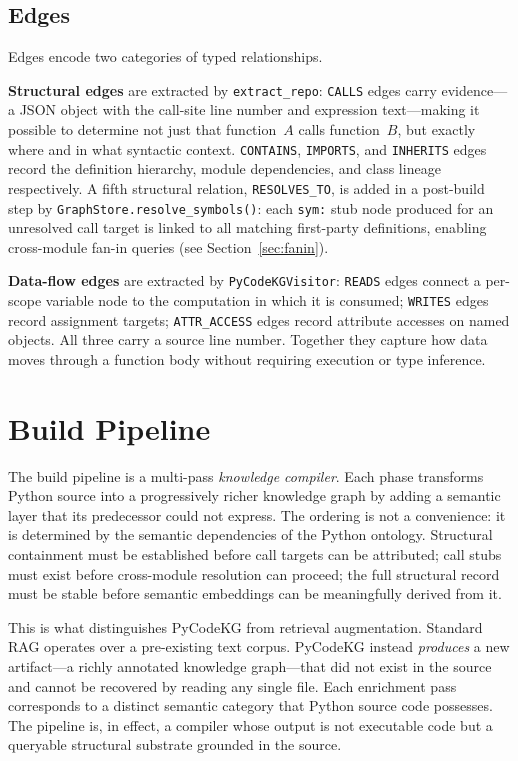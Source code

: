 \documentclass[10pt]{article}
\begin{document}
\subsection{Edges}

Edges encode two categories of typed relationships.

\textbf{Structural edges} are extracted by \texttt{extract\_repo}: \texttt{CALLS}
edges carry evidence---a JSON object with the call-site line number and expression
text---making it possible to determine not just that function~$A$ calls
function~$B$, but exactly where and in what syntactic context. \texttt{CONTAINS},
\texttt{IMPORTS}, and \texttt{INHERITS} edges record the definition hierarchy,
module dependencies, and class lineage respectively. A fifth structural relation,
\texttt{RESOLVES\_TO}, is added in a post-build step by
\texttt{GraphStore.resolve\_symbols()}: each \texttt{sym:} stub node produced
for an unresolved call target is linked to all matching first-party definitions,
enabling cross-module fan-in queries (see Section~\ref{sec:fanin}).

\textbf{Data-flow edges} are extracted by \texttt{PyCodeKGVisitor}: \texttt{READS}
edges connect a per-scope variable node to the computation in which it is consumed;
\texttt{WRITES} edges record assignment targets; \texttt{ATTR\_ACCESS} edges record
attribute accesses on named objects. All three carry a source line number. Together
they capture how data moves through a function body without requiring execution or
type inference.

\section{Build Pipeline}
\label{sec:pipeline}

The build pipeline is a multi-pass \emph{knowledge compiler}. Each phase
transforms Python source into a progressively richer knowledge graph by adding
a semantic layer that its predecessor could not express. The ordering is not
a convenience: it is determined by the semantic dependencies of the Python
ontology. Structural containment must be established before call targets can
be attributed; call stubs must exist before cross-module resolution can
proceed; the full structural record must be stable before semantic embeddings
can be meaningfully derived from it.

This is what distinguishes PyCodeKG from retrieval augmentation. Standard RAG
operates over a pre-existing text corpus. PyCodeKG instead \emph{produces}
a new artifact---a richly annotated knowledge graph---that did not exist in
the source and cannot be recovered by reading any single file. Each
enrichment pass corresponds to a distinct semantic category that Python
source code possesses. The pipeline is, in effect, a compiler whose output is
not executable code but a queryable structural substrate grounded in the
source.
\end{document}
